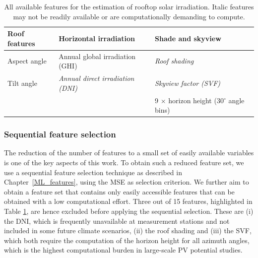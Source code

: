 \begin{table}[thb]
\centering
\footnotesize
\caption{All available features for the estimation of rooftop solar irradiation. Italic features may not be readily available or are computationally demanding to compute.}
\label{tab:chile_features}
\begin{tabular}{lll}
\hline
\textbf{Roof features} & \textbf{Horizontal irradiation}          & \textbf{Shade and skyview}         \\ \hline
Aspect angle           & Annual global irradiation (GHI)          & \textit{Roof shading}              \\
Tilt angle             & \textit{Annual direct irradiation (DNI)} & \textit{Skyview factor (SVF)}      \\
                       &                                          & 9 $\times$ horizon height (30$^\circ$ angle bins) \\ \hline
\end{tabular}
\end{table}


\subsubsection{Sequential feature selection}
The reduction of the number of features to a small set of easily available variables is one of the key aspects of this work. To obtain such a reduced feature set, we use a sequential feature selection technique as described in Chapter~\ref{ML_features}, using the MSE as selection criterion.
We further aim to obtain a feature set that contains only easily accessible features that can be obtained with a low computational effort. Three out of 15 features, highlighted in Table \ref{tab:chile_features}, are hence excluded before applying the sequential selection. These are (i) the DNI, which is frequently unavailable at measurement stations and not included in some future climate scenarios, (ii) the roof shading and (iii) the SVF, which both require the computation of the horizon height for all azimuth angles, which is the highest computational burden in large-scale PV potential studies. 

